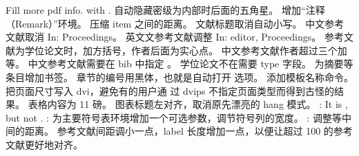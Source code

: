 {}\markdownRendererUlBegin
\markdownRendererUlItem Fill more pdf info. with .\markdownRendererUlItemEnd 
\markdownRendererUlItem 自动隐藏密级为内部时后面的五角星。\markdownRendererUlItemEnd 
\markdownRendererUlItem 增加“注释（Remark）”环境。\markdownRendererUlItemEnd 
\markdownRendererUlItem 压缩 item 之间的距离。\markdownRendererUlItemEnd 
\markdownRendererUlItem {} 文献标题取消自动小写。\markdownRendererUlItemEnd 
\markdownRendererUlItem 中文参考文献取消 In: Proceedings。\markdownRendererUlItemEnd 
\markdownRendererUlItem 英文文参考文献调整 In: editor, Proceedings。\markdownRendererUlItemEnd 
\markdownRendererUlItem 参考文献为学位论文时，加方括号，作者后面为实心点。\markdownRendererUlItemEnd 
\markdownRendererUlItem 中文参考文献作者超过三个加等。\markdownRendererUlItemEnd 
\markdownRendererUlItem 中文参考文献需要在 bib 中指定 。\markdownRendererUlItemEnd 
\markdownRendererUlItem 学位论文不在需要 type 字段。\markdownRendererUlItemEnd 
\markdownRendererUlItem 为摘要等条目增加书签。\markdownRendererUlItemEnd 
\markdownRendererUlItem 章节的编号用黑体，也就是自动打开  选项。\markdownRendererUlItemEnd 
\markdownRendererUlItem 添加模板名称命令。\markdownRendererUlItemEnd 
\markdownRendererUlItem 把页面尺寸写入 dvi，避免有的用户通 过 dvips 不指定页面类型而得到古怪的结果。\markdownRendererUlItemEnd 
\markdownRendererUlItem 表格内容为 11 磅。\markdownRendererUlItemEnd 
\markdownRendererUlItem 图表标题左对齐，取消原先漂亮的 hang 模式。\markdownRendererUlItemEnd 
\markdownRendererUlItem {}: It is , but not .\markdownRendererUlItemEnd 
\markdownRendererUlItem {}: 为主要符号表环境增加一个可选参数，调节符号列的宽度。\markdownRendererUlItemEnd 
\markdownRendererUlItem {}: 调整等中间的距离。\markdownRendererUlItemEnd 
\markdownRendererUlItem 参考文献间距调小一点，label 长度增加一点，以便让超过 100 的参考文献更好地对齐。\markdownRendererUlItemEnd 
\markdownRendererUlEnd \markdownRendererInterblockSeparator
{}\markdownRendererInterblockSeparator
{}\markdownRendererInterblockSeparator
